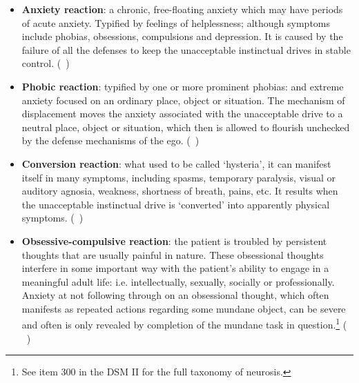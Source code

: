 \begin{refsection}
\begin{itemize}
\item \textbf{Anxiety reaction}: a chronic, free-floating anxiety which may have periods of acute anxiety. Typified by feelings of helplessness; although symptoms include phobias, obsessions, compulsions and depression. It is caused by the failure of all the defenses to keep the unacceptable instinctual drives in stable control. (~\citep[Ch. 25, p. 452]{Freud:QdOvAgyZ})

\item \textbf{Phobic reaction}: typified by one or more prominent phobias: and extreme anxiety focused on an ordinary place, object or situation. The mechanism of displacement moves the anxiety associated with the unacceptable drive to a neutral place, object or situation, which then is allowed to flourish unchecked by the defense mechanisms of the ego. (~\citep[p. 495--498]{Freud:QdOvAgyZ})

\item \textbf{Conversion reaction}: what used to be called `hysteria', it can manifest itself in many symptoms, including spasms, temporary paralysis, visual or auditory agnosia, weakness, shortness of breath, pains, etc. It results when the unacceptable instinctual drive is `converted' into apparently physical symptoms. (~\citep[p. 485, 497--8]{Freud:QdOvAgyZ})

\item \textbf{Obsessive-compulsive reaction}: the patient is troubled by persistent thoughts that are usually painful in nature. These obsessional thoughts interfere in some important way with the patient's ability to engage in a meaningful adult life: i.e. intellectually, sexually, socially or professionally. Anxiety at not following through on an obsessional thought, which often manifests as repeated actions regarding some mundane object, can be severe and often is only revealed by completion of the mundane task in question.\footnote{See item 300 in the DSM II for the full taxonomy of neurosis.} ( ~\citep[Ch. 17]{Freud:QdOvAgyZ})

\end{itemize}


\end{refsection}
